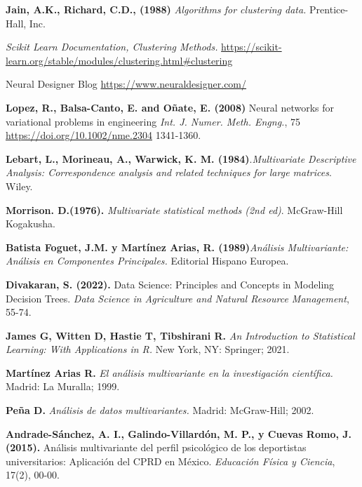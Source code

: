\begin{thebibliography}{99}
 \textbf{Jain, A.K., Richard, C.D., (1988)} \textit{Algorithms for clustering data.} Prentice-Hall, Inc. 

 \textit{Scikit Learn Documentation, Clustering Methods. } \url{https://scikit-learn.org/stable/modules/clustering.html#clustering}


 Neural Designer Blog \url{https://www.neuraldesigner.com/}
          
 \textbf{Lopez, R., Balsa-Canto, E. and Oñate, E. (2008)}  Neural networks for variational problems in engineering \emph{Int. J. Numer. Meth. Engng.}, 75\\ \url{https://doi.org/10.1002/nme.2304} 1341-1360. 


\textbf{Lebart, L., Morineau, A.,  Warwick, K. M. (1984)}.\textit{Multivariate Descriptive Analysis: Correspondence analysis and related techniques for large matrices}. Wiley.

\textbf{Morrison. D.(1976).}\textit{ Multivariate statistical methods (2nd ed)}. McGraw-Hill Kogakusha.

\textbf{Batista Foguet, J.M. y Martínez Arias, R. (1989)}\textit{Análisis Multivariante: Análisis en Componentes Principales. } Editorial Hispano Europea.

\textbf{Divakaran, S. (2022). }Data Science: Principles and Concepts in Modeling Decision Trees.\emph{ Data Science in Agriculture and Natural Resource Management}, 55-74.

\textbf{James G, Witten D, Hastie T, Tibshirani R.} \emph{An Introduction to Statistical Learning: With Applications in R.} New York, NY: Springer; 2021. 
  


\textbf{Martínez Arias R.} \emph{El análisis multivariante en la investigación científica.} Madrid: La Muralla; 1999. 
  


\textbf{Peña D.} \emph{Análisis de datos multivariantes.} Madrid: McGraw-Hill; 2002.

\textbf{Andrade-Sánchez, A. I., Galindo-Villardón, M. P., y Cuevas Romo, J. (2015).} Análisis multivariante del perfil psicológico de los deportistas universitarios: Aplicación del CPRD en México. \emph{Educación Física y Ciencia}, 17(2), 00-00.


\end{thebibliography}
